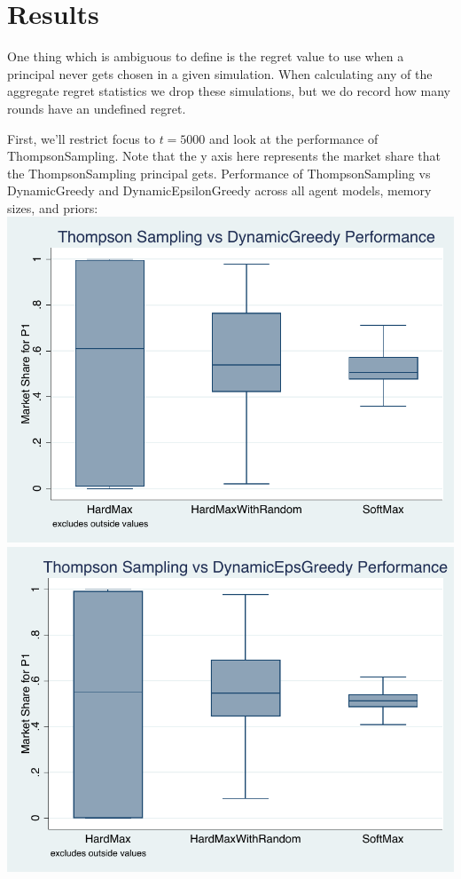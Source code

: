 \documentclass[11pt,letterpaper]{article}
\begin{document}
\pagebreak
\section*{Results}

One thing which is ambiguous to define is the regret value to use when a principal never gets chosen in a given simulation. When calculating any of the aggregate regret statistics we drop these simulations, but we do record how many rounds have an undefined regret. \\
\vspace{1cm}

First, we'll restrict focus to $t = 5000$ and look at the performance of ThompsonSampling. Note that the y axis here represents the market share that the ThompsonSampling principal gets.
\vspace{0.5cm}
Performance of ThompsonSampling vs DynamicGreedy and DynamicEpsilonGreedy across all agent models, memory sizes, and priors: \\
\includegraphics[scale=0.75]{ts_perf_dg} \\
\includegraphics[scale=0.75]{ts_perf_deg} \\
\end{document}
